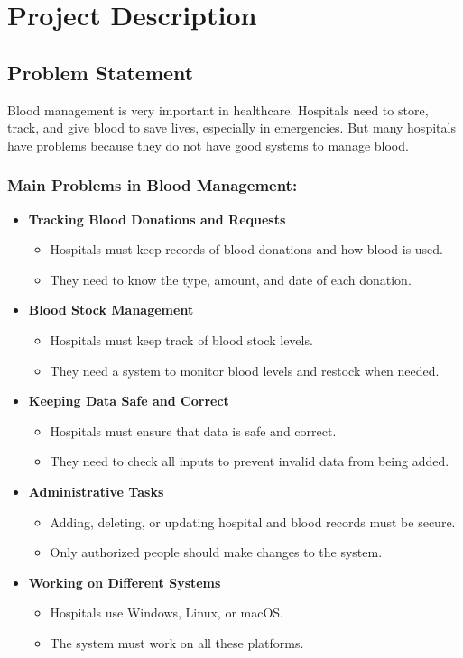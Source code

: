 \documentclass[12pt,a4paper]{report}
\begin{document}
\chapter{Project Description}
\section{Problem Statement}
Blood management is very important in healthcare. Hospitals need to store, track, and give blood to save lives,
especially in emergencies. But many hospitals have problems because they do not have good systems to manage blood.

\subsection{Main Problems in Blood Management:}
\begin{itemize}
    \item \normalsize \textbf{Tracking Blood Donations and Requests}
    \begin{itemize}
        \item Hospitals must keep records of blood donations and how blood is used.
        \item They need to know the type, amount, and date of each donation.
    \end{itemize}
    \item \normalsize \textbf{Blood Stock Management}
    \begin{itemize}
        \item Hospitals must keep track of blood stock levels.
        \item They need a system to monitor blood levels and restock when needed.
    \end{itemize}
    \item \normalsize \textbf{Keeping Data Safe and Correct}
    \begin{itemize}
        \item Hospitals must ensure that data is safe and correct.
        \item They need to check all inputs to prevent invalid data from being added.
    \end{itemize}
    \item \normalsize \textbf{Administrative Tasks}
    \begin{itemize}
        \item Adding, deleting, or updating hospital and blood records must be secure.
        \item Only authorized people should make changes to the system.
    \end{itemize}
    \item \normalsize \textbf{Working on Different Systems}
    \begin{itemize}
        \item Hospitals use Windows, Linux, or macOS.\
        \item The system must work on all these platforms.
    \end{itemize}
\end{itemize}
\end{document}
